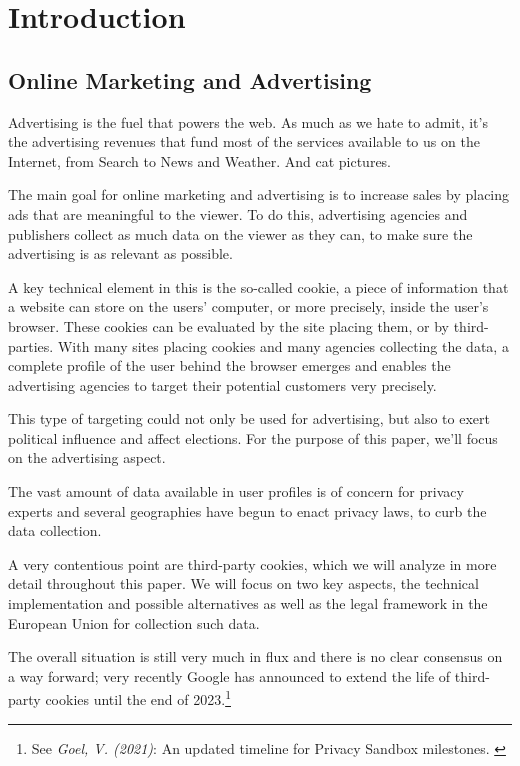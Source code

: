 %
%

\pagebreak
\section{Introduction}

\onehalfspacing

\subsection{Online Marketing and Advertising}

Advertising is the fuel that powers the web. As much as we hate to admit, it's the advertising revenues that fund most of the services available to us on the Internet, from Search to News and Weather. And cat pictures.

The main goal for online marketing and advertising is to increase sales by placing ads that are meaningful to the viewer. To do this, advertising agencies and publishers collect as much data on the viewer as they can, to make sure the advertising is as relevant as possible.

A key technical element in this is the so-called cookie, a piece of information that a website can store on the users' computer, or more precisely, inside the user's browser. These cookies can be evaluated by the site placing them, or by third-parties. With many sites placing cookies and many agencies collecting the data, a complete profile of the user behind the browser emerges and enables the advertising agencies to target their potential customers very precisely.

This type of targeting could not only be used for advertising, but also to exert political influence and affect elections. For the purpose of this paper, we'll focus on the advertising aspect.

The vast amount of data available in user profiles is of concern for privacy experts and several geographies have begun to enact privacy laws, to curb the data collection.

A very contentious point are third-party cookies, which we will analyze in more detail throughout this paper. We will focus on two key aspects, the technical implementation and possible alternatives as well as the legal framework in the European Union for collection such data.

The overall situation is still very much in flux and there is no clear consensus on a way forward; very recently Google has announced to extend the life of third-party cookies until the end of 2023.\footnote{See \textit{Goel, V. (2021)}: An updated timeline for Privacy Sandbox milestones. \cite{sandboxDelay}}

